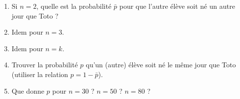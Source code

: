 \begin{enumerate}
	\item Si $n=2$, quelle est la probabilité $\bar{p}$ pour que l'autre élève
	soit né un autre jour que Toto ?
	
	\item Idem pour $n=3$.
	
	\item Idem pour $n=k$.
	
	\item Trouver la probabilité $p$ 
	qu'un (autre) élève soit né le même jour que Toto 
	(utiliser la relation $p = 1-\bar{p}$).
	
	\item Que donne $p$ pour $n=30$ ? $n=50$ ? $n=80$ ?
	
\end{enumerate}

